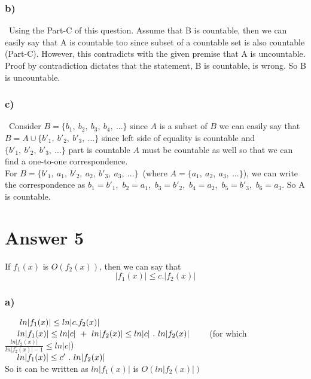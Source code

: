 \documentclass[12pt]{article}
\begin{document}
\subsubsection*{b)}
\hspace{0.5cm}\ Using the Part-C of this question. Assume that B is countable, then we can easily say that A is countable too since subset of a countable set is also countable (Part-C). However, this contradicts with the given premise that A is uncountable. Proof by contradiction dictates that the statement, B is countable, is wrong. So B is uncountable.
\subsubsection*{c)}
\hspace{0.5cm}\ Consider $B=\{b_1,\ b_2,\ b_3,\ b_4,\ ...\}$ since $A$ is a subset of $B$ we can easily say that \\ 
$B=A\cup \{b'_1,\ b'_2,\ b'_3,\ ...\}$ since left side of equality is countable and $\{b'_1,\ b'_2,\ b'_3,\ ...\}$ part is countable $A$ must be countable as well so that we can find a one-to-one correspondence.\\
\vspace{0.1cm}
\hspace{0.5cm}For $B=\{b'_1,\ a_1,\ b'_2,\ a_2,\ b'_3,\ a_3,\ ...\}$\ (where $A=\{a_1,\ a_2,\ a_3,\ ...\}$), we can write the correspondence as $b_1=b'_1$,\ $b_2=a_1$,\ $b_3=b'_2$,\ $b_4=a_2$,\ $b_5=b'_3$,\ $b_6=a_3$. So A is countable.

\section*{Answer 5} 

If $f_1 (x)$ is $O(f_2 (x))$, then we can say that 
$$ |f_1 (x)| \leq c . |f_2 (x)|$$
\subsubsection*{a)}
$\hspace{0.5cm}\ ln|f_1(x)| \leq ln|c . f_2(x)|$ \\
\vspace{0.1cm}
$\hspace{0.5cm}ln|f_1(x)| \leq ln|c|\ +\ ln|f_2(x)| \leq ln|c|\ .\ ln|f_2(x)|\qquad$     (for which $ \frac{ln|f_2(x)|}{ln|f_2(x)|-1} \leq ln|c|$) \\
\vspace{0.1cm}
$\hspace{0.5cm}ln|f_1(x)| \leq  c' \ .\ ln |f_2(x)|$ \\
\vspace{0.1cm}
\hspace{0.5cm}So it can be written as $ln|f_1 (x)|$ is $O(ln|f_2 (x)|)$
\end{document}
